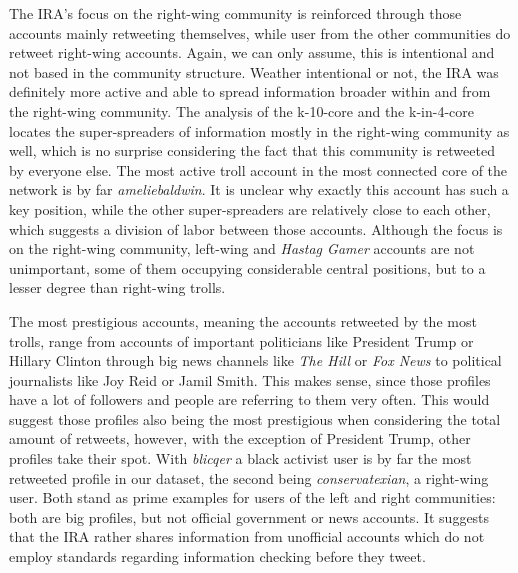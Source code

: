 \documentclass[12pt, titlepage=true, toc=bib]{scrartcl}
\begin{document}
The IRA's focus on the right-wing community is reinforced through those accounts mainly retweeting themselves, while user from the other communities do retweet right-wing accounts. Again, we can only assume, this is intentional and not based in the community structure. Weather intentional or not, the IRA was definitely more active and able to spread information broader within and from the right-wing community. The analysis of the k-10-core and the k-in-4-core locates the super-spreaders of information mostly in the right-wing community as well, which is no surprise considering the fact that this community is retweeted by everyone else. The most active troll account in the most connected core of the network is by far \textit{ameliebaldwin}. It is unclear why exactly this account has such a key position, while the other super-spreaders are relatively close to each other, which suggests a division of labor between those accounts. Although the focus is on the right-wing community, left-wing and \textit{Hastag Gamer} accounts are not unimportant, some of them occupying considerable central positions, but to a lesser degree than right-wing trolls.

The most prestigious accounts, meaning the accounts retweeted by the most trolls, range from accounts of important politicians like President Trump or Hillary Clinton through big news channels like \textit{The Hill} or \textit{Fox News} to political journalists like Joy Reid or Jamil Smith. This makes sense, since those profiles have a lot of followers and people are referring to them very often. This would suggest those profiles also being the most prestigious when considering the total amount of retweets, however, with the exception of President Trump, other profiles take their spot. With \textit{blicqer} a black activist user is by far the most retweeted profile in our dataset, the second being \textit{conservatexian}, a right-wing user. Both stand as prime examples for users of the left and right communities: both are big profiles, but not official government or news accounts. It suggests that the IRA rather shares information from unofficial accounts which do not employ standards regarding information checking before they tweet.
\end{document}
